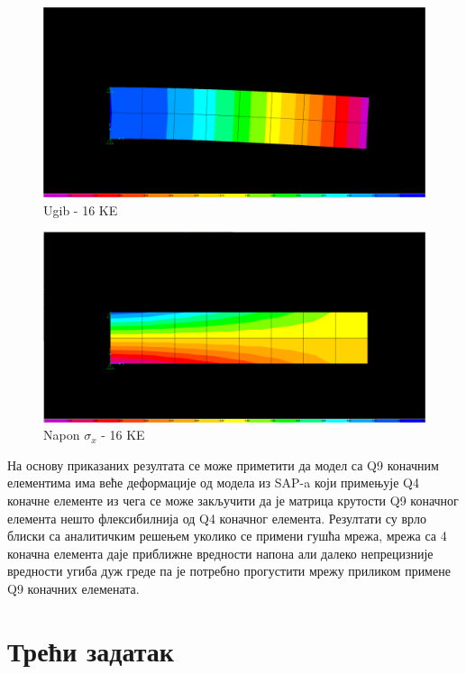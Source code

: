 \documentclass[11pt, a4paper]{article}
\begin{document}
\begin{figure}[H]
\includegraphics[width=\textwidth]{Slike/Ugib_16KE.png}
\caption{Ugib - 16 KE}
\end{figure}
\begin{figure}[H]
\includegraphics[width=\textwidth]{Slike/Naponi_16KE.png}
\caption{Napon $\sigma_x$ - 16 KE}
\end{figure}
На основу приказаних резултата се може приметити да модел са Q9 коначним елементима има веће деформације од модела из SAP-a који примењује Q4 коначне елементе из чега се може закључити да је матрица крутости Q9 коначног елемента нешто флексибилнија од Q4 коначног елемента. Резултати су врло блиски са аналитичким решењем уколико се примени гушћа мрежа, мрежа са 4 коначна елемента даје приближне вредности напона али далеко непрецизније вредности угиба дуж греде па је потребно прогустити мрежу приликом примене Q9 коначних елемената.
\newpage
\section{Трећи задатак}
\end{document}
